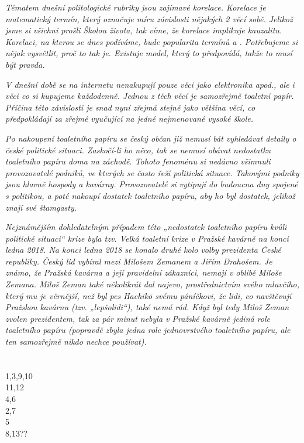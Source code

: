 \documentclass[12pt, a4paper]{article}
\begin{document}
\textit{Tématem dnešní politologické rubriky jsou zajímavé korelace. Korelace je matematický termín, který označuje míru závislosti nějakých 2 věcí sobě. Jelikož jsme si všichni prošli Školou života, tak víme, že korelace implikuje kauzalitu. Korelaci, na kterou se dnes podíváme, bude popularita termínů  a . Potřebujeme si nějak vysvětlit, proč to tak je. Existuje model, který to předpovídá, takže to musí být pravda. }

\textit{V dnešní době se na internetu nenakupují pouze věci jako elektronika apod., ale i věci co si kupujeme každodenně. Jednou z těch věcí je samozřejmě toaletní papír. Příčina této závislosti je snad nyní zřejmá stejně jako většina věcí, co předpokládají za zřejmé vyučující na jedné nejmenované vysoké škole.}

\textit{Po nakoupení toaletního papíru se český občan již nemusí bát vyhledávat detaily o české politické situaci. Zaskočí-li ho něco, tak se nemusí obávat nedostatku toaletního papíru doma na záchodě. Tohoto fenoménu si nedávno všimnuli provozovatelé podniků, ve kterých se často řeší politická situace. Takovými podniky jsou hlavně hospody a kavárny. Provozovatelé si vytipují do budoucna dny spojené s politikou, a poté nakoupí dostatek toaletního papíru, aby ho byl dostatek, jelikož znají své štamgasty.}

\textit{Nejznámějším dohledatelným případem této „nedostatek toaletního papíru kvůli politické situaci“ krize byla tzv. Velká toaletní krize v Pražské kavárně na konci ledna 2018. Na konci ledna 2018 se konalo druhé kolo volby prezidenta České republiky. Český lid vybíral mezi Milošem Zemanem a Jiřím Drahošem. Je známo, že Pražská kavárna a její pravidelní zákazníci, nemají v oblibě Miloše Zemana. Miloš Zeman také několikrát dal najevo, prostřednictvím svého mluvčího, který mu je věrnější, než byl pes Hachikō svému páníčkovi, že lidi, co navštěvují Pražskou kavárnu (tzv. „lepšolidi“), také nemá rád. Když byl tedy Miloš Zeman zvolen prezidentem, tak za pár minut nebyla v Pražské kavárně jediná role toaletního papíru (popravdě zbyla jedna role jednovrstvého toaletního papíru, ale ten samozřejmě nikdo nechce používat).}

\section{}
1,3,9,10\\
11,12\\
4,6\\
2,7\\
5\\
8,13??
\end{document}
